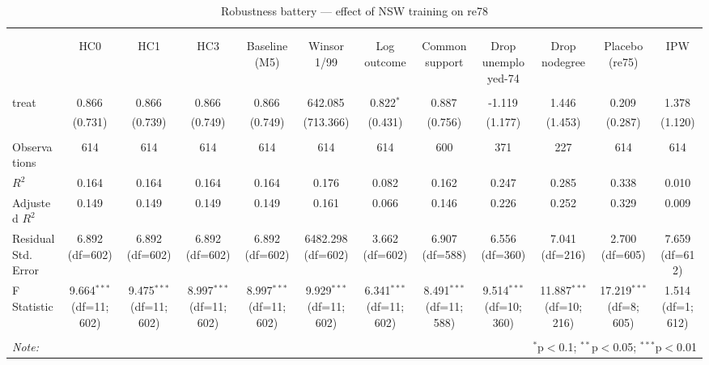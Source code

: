 \begin{table}[!htbp] \centering
  \caption{Robustness battery — effect of NSW training on re78}
\begin{tabular}{@{\extracolsep{5pt}}lccccccccccc}
\\[-1.8ex]\hline
\hline \\[-1.8ex]
\\[-1.8ex] & \multicolumn{1}{c}{HC0} & \multicolumn{1}{c}{HC1} & \multicolumn{1}{c}{HC3} & \multicolumn{1}{c}{Baseline (M5)} & \multicolumn{1}{c}{Winsor 1/99} & \multicolumn{1}{c}{Log outcome} & \multicolumn{1}{c}{Common support} & \multicolumn{1}{c}{Drop unemployed-74} & \multicolumn{1}{c}{Drop nodegree} & \multicolumn{1}{c}{Placebo (re75)} & \multicolumn{1}{c}{IPW}  \\
\hline \\[-1.8ex]
 treat & 0.866$^{}$ & 0.866$^{}$ & 0.866$^{}$ & 0.866$^{}$ & 642.085$^{}$ & 0.822$^{*}$ & 0.887$^{}$ & -1.119$^{}$ & 1.446$^{}$ & 0.209$^{}$ & 1.378$^{}$ \\
& (0.731) & (0.739) & (0.749) & (0.749) & (713.366) & (0.431) & (0.756) & (1.177) & (1.453) & (0.287) & (1.120) \\
\hline \\[-1.8ex]
 Observations & 614 & 614 & 614 & 614 & 614 & 614 & 600 & 371 & 227 & 614 & 614 \\
 $R^2$ & 0.164 & 0.164 & 0.164 & 0.164 & 0.176 & 0.082 & 0.162 & 0.247 & 0.285 & 0.338 & 0.010 \\
 Adjusted $R^2$ & 0.149 & 0.149 & 0.149 & 0.149 & 0.161 & 0.066 & 0.146 & 0.226 & 0.252 & 0.329 & 0.009 \\
 Residual Std. Error & 6.892 (df=602) & 6.892 (df=602) & 6.892 (df=602) & 6.892 (df=602) & 6482.298 (df=602) & 3.662 (df=602) & 6.907 (df=588) & 6.556 (df=360) & 7.041 (df=216) & 2.700 (df=605) & 7.659 (df=612) \\
 F Statistic & 9.664$^{***}$ (df=11; 602) & 9.475$^{***}$ (df=11; 602) & 8.997$^{***}$ (df=11; 602) & 8.997$^{***}$ (df=11; 602) & 9.929$^{***}$ (df=11; 602) & 6.341$^{***}$ (df=11; 602) & 8.491$^{***}$ (df=11; 588) & 9.514$^{***}$ (df=10; 360) & 11.887$^{***}$ (df=10; 216) & 17.219$^{***}$ (df=8; 605) & 1.514$^{}$ (df=1; 612) \\
\hline
\hline \\[-1.8ex]
\textit{Note:} & \multicolumn{11}{r}{$^{*}$p$<$0.1; $^{**}$p$<$0.05; $^{***}$p$<$0.01} \\
\end{tabular}
\end{table}
